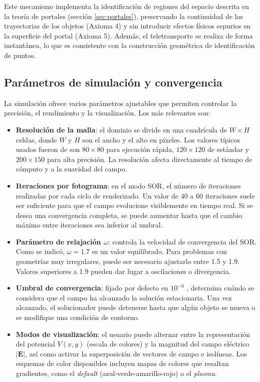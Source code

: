 \documentclass[12pt, twocolumn]{article}
\begin{document}
Este mecanismo implementa la identificación de regiones del espacio descrita en la teoría de portales (sección \ref{sec:portales}), preservando la continuidad de las trayectorias de los objetos (Axioma 4) y sin introducir efectos físicos espurios en la superficie del portal (Axioma 5). Además, el teletransporte se realiza de forma instantánea, lo que es consistente con la construcción geométrica de identificación de puntos.


\subsection{Parámetros de simulación y convergencia}

La simulación ofrece varios parámetros ajustables que permiten controlar la precisión, el rendimiento y la visualización. Los más relevantes son:
\begin{itemize}
    \item \textbf{Resolución de la malla}: el dominio se divide en una cuadrícula de $W \times H$ celdas, donde $W$ y $H$ son el ancho y el alto en píxeles. Los valores típicos usados fueron de  son $80 \times 80$ para ejecución rápida, $120 \times 120$ de estándar y $200 \times 150$ para alta precisión. La resolución afecta directamente al tiempo de cómputo y a la suavidad del campo.
    \item \textbf{Iteraciones por fotograma}: en el modo SOR, el número de iteraciones realizadas por cada ciclo de renderizado. Un valor de 40 a 60 iteraciones suele ser suficiente para que el campo evolucione visiblemente en tiempo real. Si se desea una convergencia completa, se puede aumentar hasta que el cambio máximo entre iteraciones sea inferior al umbral. 
    \item \textbf{Parámetro de relajación $\omega$}: controla la velocidad de convergencia del SOR. Como se indicó, $\omega = 1.7$ es un valor equilibrado. Para problemas con geometrías muy irregulares, puede ser necesario ajustarlo entre 1.5 y 1.9. Valores superiores a 1.9 pueden dar lugar a oscilaciones o divergencia.
    \item \textbf{Umbral de convergencia}: fijado por defecto en $10^{-6}$ , determina cuándo se considera que el campo ha alcanzado la solución estacionaria. Una vez alcanzado, el solucionador puede detenerse hasta que algún objeto se mueva o se modifique una condición de contorno.
    \item \textbf{Modos de visualización}: el usuario puede alternar entre la representación del potencial $V(x,y)$ (escala de colores) y la magnitud del campo eléctrico $|\mathbf{E}|$, así como activar la superposición de vectores de campo e isolíneas. Los esquemas de color disponibles incluyen mapas de colores que resaltan gradientes, como el \textit{default} (azul-verde-amarillo-rojo) o el \textit{plasma}.
\end{itemize}
\end{document}
